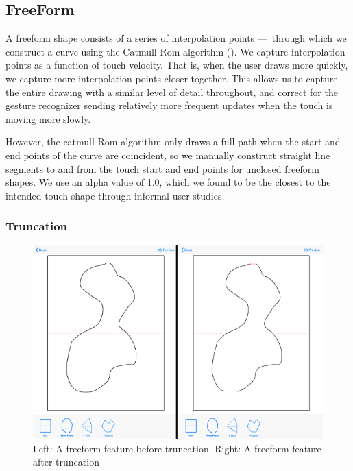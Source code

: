\subsection{FreeForm}\label{freeform}

A freeform shape consists of a series of interpolation points
---~through which we construct a curve using the Catmull-Rom algorithm
(\citet{catmull1974class}). We capture interpolation points as a
function of touch velocity. That is, when the user draws more quickly,
we capture more interpolation points closer together. This allows us to
capture the entire drawing with a similar level of detail throughout,
and correct for the gesture recognizer sending relatively more frequent
updates when the touch is moving more slowly.

However, the catmull-Rom algorithm only draws a full path when the start
and end points of the curve are coincident, so we manually construct
straight line segments to and from the touch start and end points for
unclosed freeform shapes. We use an alpha value of 1.0, which we found
to be the closest to the intended touch shape through informal user
studies.

\subsubsection{Truncation}\label{truncation}

\begin{figure}[htbp]
\centering
\includegraphics{figures/41_Tech_Tool_Implementation/truncationBeforeAfter.pdf}
\caption{Left: A freeform feature before truncation. Right: A freeform
feature after truncation}
\end{figure}

